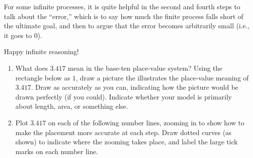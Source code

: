 For some infinite processes, it is quite helpful in the second and fourth steps to talk about the ``error,'' which is to say how much the finite process falls short of the ultimate goal, and then to argue that the error becomes arbitrarily small (i.e., it goes to 0). 

\vspace{0.2in}

Happy infinite reasoning!   

\newpage

\begin{problems}
\begin{enumerate}

\subsection*{Exercises}

\item What does $3.417$ mean in the base-ten place-value system?  Using the rectangle below as $1$, draw a picture the illustrates the place-value meaning of $3.417$.  Draw as accurately as you can, indicating how the picture would be drawn perfectly (if you could).  Indicate whether your model is primarily about length, area, or something else.  

\vspace{.5cm}

\item Plot $3.417$ on each of the following number lines, zooming in to show how to make the placement more accurate at each step.  Draw dotted curves (as shown) to indicate where the zooming takes place, and label the large tick marks on each number line.  
\vspace{0.5cm}



\end{enumerate}
\end{problems}
